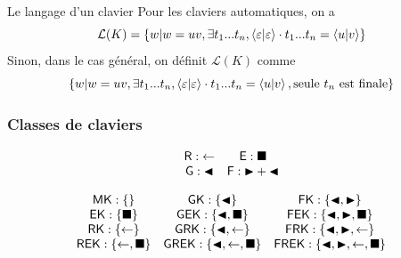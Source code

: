 \documentclass[11pt,french,professionalfonts]{beamer}
\renewcommand{\L}{\mathcal{L}}
\begin{document}
\begin{frame}{Le langage d'un clavier}
	Pour les claviers automatiques, on a \[\L(K) = \{w | w =uv, \exists t_1...t_n, \conf{\varepsilon}{\varepsilon}\cdot t_1...t_n = \conf{u}{v}\}\] \pause
    Sinon, dans le cas général, on définit $\L(K)$ comme \[\{w | w =uv, \exists t_1...t_n, \conf{\varepsilon}{\varepsilon}\cdot t_1...t_n = \conf{u}{v}, \mathrm{seule~} t_n \mathrm{~est~finale}\}\]
\end{frame}


\begin{frame}
	\frametitle{Classes de claviers}
	\[
	 \begin{array}{cc}
		\mathsf{R}:  \retour & \mathsf{E}:  \entree \\
        \mathsf{G}:  \gauche & \mathsf{F}:  \droite + \gauche \\
	 \end{array}
	\]

	\[
		\begin{array}{ccc}
			\MK : \{\} & \GK : \{\gauche\} & \FK :\{\gauche,\droite\} \\
			\EK : \{\entree\} & \GEK : \{\gauche,\entree\} & \FEK :\{\gauche,\droite,\entree\} \\
			\RK : \{\retour\} & \GRK : \{\gauche,\retour\} & \FRK :\{\gauche,\droite,\retour\} \\
			\REK : \{\retour, \entree\} & \GREK : \{\gauche,\retour,\entree\} & \FREK :\{\gauche,\droite,\retour,\entree\} \\
		\end{array}
	\]
 \end{frame}
\end{document}
